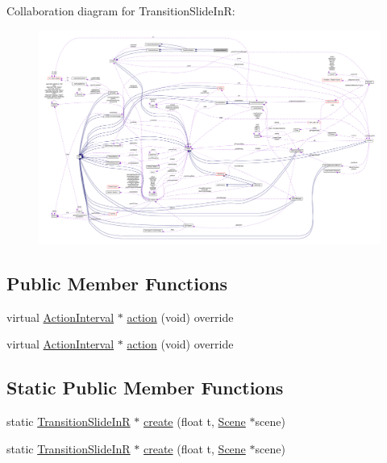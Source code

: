 Collaboration diagram for Transition\+Slide\+InR\+:
\nopagebreak
\begin{figure}[H]
\begin{center}
\leavevmode
\includegraphics[width=350pt]{classTransitionSlideInR__coll__graph}
\end{center}
\end{figure}
\subsection*{Public Member Functions}
\begin{DoxyCompactItemize}
\item 
virtual \hyperlink{classActionInterval}{Action\+Interval} $\ast$ \hyperlink{classTransitionSlideInR_a62161e5858110ef0122d98377f9a2cb7}{action} (void) override
\item 
virtual \hyperlink{classActionInterval}{Action\+Interval} $\ast$ \hyperlink{classTransitionSlideInR_a8b573f57d622f77739e36a03e9b80d3a}{action} (void) override
\end{DoxyCompactItemize}
\subsection*{Static Public Member Functions}
\begin{DoxyCompactItemize}
\item 
static \hyperlink{classTransitionSlideInR}{Transition\+Slide\+InR} $\ast$ \hyperlink{classTransitionSlideInR_aedc1e8cbe31e4f4cb97c23efa4c88770}{create} (float t, \hyperlink{classScene}{Scene} $\ast$scene)
\item 
static \hyperlink{classTransitionSlideInR}{Transition\+Slide\+InR} $\ast$ \hyperlink{classTransitionSlideInR_aa6ebd02f506fbb1e947e97215ef54cec}{create} (float t, \hyperlink{classScene}{Scene} $\ast$scene)
\end{DoxyCompactItemize}
